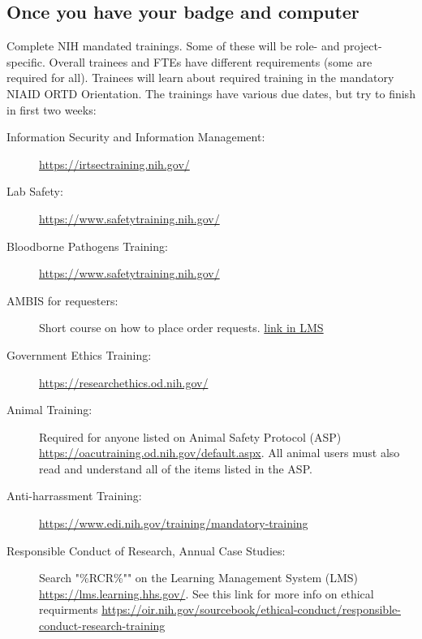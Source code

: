 \documentclass[10pt, letterpaper, twocolumn]{article} %
\begin{document}
\subsection{Once you have your badge and computer}
Complete NIH mandated trainings. Some of these will be role- and project-specific. Overall trainees and FTEs have different requirements (some are required for all).  Trainees will learn about required training in the mandatory NIAID ORTD Orientation.
The trainings have various due dates, but try to finish in first two weeks:
\begin{description}
\item[Information Security and Information Management:]\href{https://irtsectraining.nih.gov/}{https://irtsectraining.nih.gov/}
\item[Lab Safety:]\href{https://www.safetytraining.nih.gov/}{https://www.safetytraining.nih.gov/}
\item[Bloodborne Pathogens Training:]\href{https://www.safetytraining.nih.gov/}{https://www.safetytraining.nih.gov/}
\item[AMBIS for requesters:] Short course on how to place order requests. \href{https://lms.learning.hhs.gov/Saba/Web_wdk/Main/learning/learningOfferingDetails.rdf}{link in LMS}
\item[Government Ethics Training:]\href{https://researchethics.od.nih.gov/}{https://researchethics.od.nih.gov/}
\item[Animal Training:]Required for anyone listed on Animal Safety Protocol (ASP) \href{https://oacutraining.od.nih.gov/default.aspx}{https://oacutraining.od.nih.gov/default.aspx}. All animal users must also read and understand all of the items listed in the ASP.
\item[Anti-harrassment Training:]\href{https://www.edi.nih.gov/training/mandatory-training}{https://www.edi.nih.gov/training/mandatory-training}
\item[Responsible Conduct of Research, Annual Case Studies:] Search  "\%RCR\%"" on the Learning Management System (LMS) \href{https://lms.learning.hhs.gov/}{https://lms.learning.hhs.gov/}. See this link for more info on ethical requirments \href{https://oir.nih.gov/sourcebook/ethical-conduct/responsible-conduct-research-training}{https://oir.nih.gov/sourcebook/ethical-conduct/responsible-conduct-research-training}
\end{description}
\end{document}

